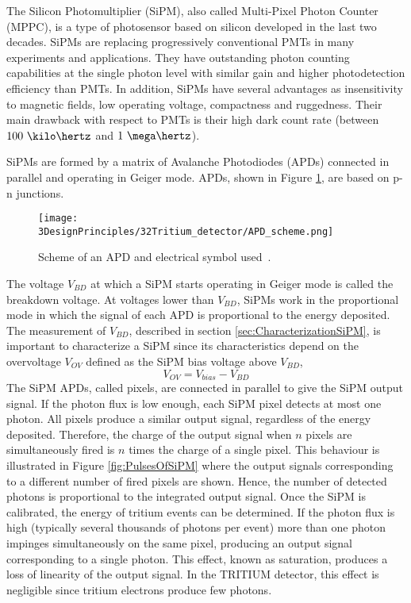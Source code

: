 The Silicon Photomultiplier (SiPM), also called Multi-Pixel Photon Counter (MPPC), is a type of photosensor based on silicon developed in the last two decades. SiPMs are replacing progressively conventional PMTs in many experiments and applications. They have outstanding photon counting capabilities at the single photon level with similar gain and higher photodetection efficiency than PMTs. In addition, SiPMs have several advantages as insensitivity to magnetic fields, low operating voltage, compactness and ruggedness. Their main drawback with respect to PMTs is their high dark count rate (between $100~\kilo\hertz$ and $1~\mega\hertz$).

SiPMs are formed by a matrix of Avalanche Photodiodes (APDs) connected in parallel and operating in Geiger mode. APDs, shown in Figure \ref{fig:SchemeAPD}, are based on p-n junctions.
\begin{figure}[htbp]
\centering
\texttt{[image: 3DesignPrinciples/32Tritium\_detector/APD\_scheme.png]}
\caption{Scheme of an APD and electrical symbol used\label{fig:SchemeAPD}~\cite{OSI}.}
\end{figure}
The voltage $V_ {BD}$ at which a SiPM starts operating in Geiger mode is called the breakdown voltage. At voltages lower than $V_ {BD}$, SiPMs work in the proportional mode in which the signal of each APD is proportional to the energy deposited. The measurement of $V_ {BD}$, described in section \ref{sec:CharacterizationSiPM}, is important to characterize a SiPM since its characteristics depend on the overvoltage $V_{OV}$ defined as the SiPM bias voltage above $V_ {BD}$,
\begin{equation}
V_{OV}=V_{bias}-V_{BD}
\label{overvoltage}
\end{equation}
The SiPM APDs, called pixels, are connected in parallel to give the SiPM output signal. If the photon flux is low enough, each SiPM pixel detects at most one photon. All pixels produce a similar output signal, regardless of the energy deposited. Therefore, the charge of the output signal when $n$ pixels are simultaneously fired is $n$ times the charge of a single pixel. This behaviour is illustrated in Figure \ref{fig:PulsesOfSiPM} where the output signals corresponding to a different number of fired pixels are shown. Hence, the number of detected photons is proportional to the integrated output signal. Once the SiPM is calibrated, the energy of tritium events can be determined. If the photon flux is high (typically several thousands of photons per event) more than one photon impinges simultaneously on the same pixel, producing an output signal corresponding to a single photon. This effect, known as saturation, produces a loss of linearity of the output signal. In the TRITIUM detector, this effect is negligible since tritium electrons produce few photons. %

